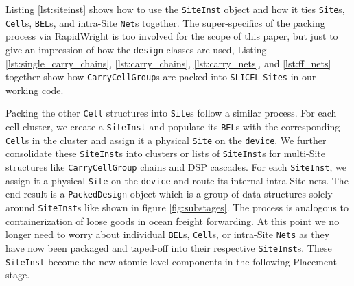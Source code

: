 
Listing \ref{lst:siteinst} shows how to use the \texttt{SiteInst} object and how it ties \texttt{Site}s, \texttt{Cell}s, \texttt{BEL}s, and intra-Site \texttt{Net}s together. 
The super-specifics of the packing process via RapidWright is too involved for the scope of this paper, but just to give an impression of how the \texttt{design} classes are used, Listing \ref{lst:single_carry_chains}, \ref{lst:carry_chains}, \ref{lst:carry_nets}, and \ref{lst:ff_nets} together show how \texttt{CarryCellGroup}s are packed into \texttt{SLICEL} \texttt{Sites} in our working code. 

Packing the other \texttt{Cell} structures into \texttt{Site}s follow a similar process. 
For each cell cluster, we create a \texttt{SiteInst} and populate its \texttt{BEL}s with the corresponding \texttt{Cell}s in the cluster and assign it a physical \texttt{Site} on the \texttt{device}.
We further consolidate these \texttt{SiteInst}s into clusters or lists of \texttt{SiteInst}s for multi-Site structures like \texttt{CarryCellGroup} chains and DSP cascades. 
For each \texttt{SiteInst}, we assign it a physical \texttt{Site} on the \texttt{device} and route its internal intra-Site nets. 
The end result is a \texttt{PackedDesign} object which is a group of data structures solely around \texttt{SiteInst}s like shown in figure \ref{fig:substages}.
The process is analogous to containerization of loose goods in ocean freight forwarding. 
At this point we no longer need to worry about individual \texttt{BEL}s, \texttt{Cell}s, or intra-Site \texttt{Nets} as they have now been packaged and taped-off into their respective \texttt{SiteInst}s. 
These \texttt{SiteInst} become the new atomic level components in the following Placement stage. 

